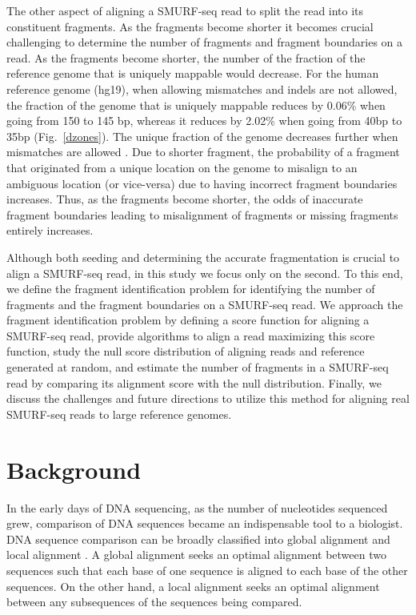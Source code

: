 The other aspect of aligning a SMURF-seq read to split the read into its
constituent fragments. As the fragments become shorter it becomes crucial
challenging to determine the number of fragments and fragment
boundaries on a read.
%
As the fragments become shorter, the number of the fraction of the
reference genome that is uniquely mappable would decrease. For the human
reference genome (hg19), when allowing mismatches and indels are not
allowed, the fraction of the genome that is uniquely mappable reduces by
0.06\% when going from 150 to 145 bp, whereas it reduces by 2.02\% when
going from 40bp to 35bp (Fig.~\ref{dzones}).  The unique fraction of the
genome decreases further when mismatches are allowed
\citep{derrien2012fast}.
Due to shorter fragment, the probability of a fragment that originated
from a unique location on the genome to misalign to an ambiguous
location (or vice-versa) due to having incorrect fragment boundaries
increases.
%
Thus, as the fragments become shorter, the odds of inaccurate fragment
boundaries leading to misalignment of fragments or missing fragments
entirely increases.

Although both seeding and determining the accurate fragmentation is
crucial to align a SMURF-seq read, in this study we focus only on the
second.
%
To this end, we define the fragment identification problem for
identifying the number of fragments and the fragment boundaries on a
SMURF-seq read.  We approach the fragment identification problem by
defining a score function for aligning a SMURF-seq read, provide
algorithms to align a read maximizing this score function,
study the null
score distribution of aligning reads and reference generated at random,
and estimate the number of fragments in a SMURF-seq read by comparing
its alignment score with the null distribution.
%
Finally, we discuss the challenges and future directions to utilize this
method for aligning real SMURF-seq reads to large reference genomes.



\section{Background}
\label{ch4_background}
In the early days of DNA sequencing, as the number of nucleotides
sequenced grew, comparison of DNA sequences became an indispensable tool
to a biologist.
%
DNA sequence comparison can be broadly classified into global alignment
\citep{needleman1970general} and local alignment
\citep{smith1981identification}. A global alignment seeks an optimal
alignment between two sequences such that each base of one sequence is
aligned to each base of the other sequences. On the other hand, a local
alignment seeks an optimal alignment between any subsequences of the
sequences being compared.


